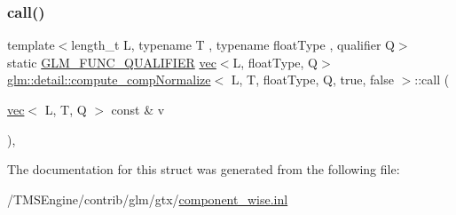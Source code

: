 \subsubsection{\texorpdfstring{call()}{call()}}
{\footnotesize\ttfamily template$<$length\+\_\+t L, typename T , typename float\+Type , qualifier Q$>$ \\
static \hyperlink{setup_8hpp_a33fdea6f91c5f834105f7415e2a64407}{G\+L\+M\+\_\+\+F\+U\+N\+C\+\_\+\+Q\+U\+A\+L\+I\+F\+I\+ER} \hyperlink{structglm_1_1vec}{vec}$<$L, float\+Type, Q$>$ \hyperlink{structglm_1_1detail_1_1compute__comp_normalize}{glm\+::detail\+::compute\+\_\+comp\+Normalize}$<$ L, T, float\+Type, Q, true, false $>$\+::call (\begin{DoxyParamCaption}\item[{\hyperlink{structglm_1_1vec}{vec}$<$ L, T, Q $>$ const \&}]{v }\end{DoxyParamCaption})\hspace{0.3cm}{\ttfamily [inline]}, {\ttfamily [static]}}



The documentation for this struct was generated from the following file\+:\begin{DoxyCompactItemize}
\item 
/\+T\+M\+S\+Engine/contrib/glm/gtx/\hyperlink{component__wise_8inl}{component\+\_\+wise.\+inl}\end{DoxyCompactItemize}
